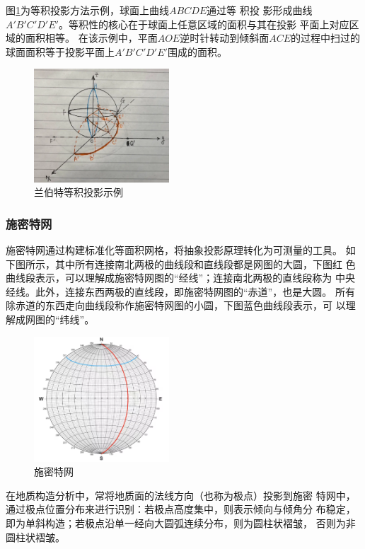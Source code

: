 \documentclass[a4paper,twoside]{ctexart}
\begin{document}
图\ref{fig:兰伯特等积投影}为等积投影方法示例，球面上曲线$ABCDE$通过等
积投
影形成曲线$A'B'C'D'E'$。等积性的核心在于球面上任意区域的面积与其在投影
平面上对应区域的面积相等。
在该示例中，平面$AOE$逆时针转动到倾斜面$ACE$的过程中扫过的
球面面积等于投影平面上$A'B'C'D'E'$围成的面积。

\begin{figure}[htbp]
  \centering
    \includegraphics[width=0.45\textwidth]{pic/兰伯特等积投影.png}
  \caption{兰伯特等积投影示例}
  \label{fig:兰伯特等积投影}
\end{figure}

\subsubsection{施密特网}

施密特网通过构建标准化等面积网格，将抽象投影原理转化为可测量的工具。
如下图所示，其中所有连接南北两极的曲线段和直线段都是网图的大圆，下图红
色曲线段表示，可以理解成施密特网图的“经线”；连接南北两极的直线段称为
中央经线。此外，连接东西两极的直线段，即施密特网图的“赤道”，也是大圆。
所有除赤道的东西走向曲线段称作施密特网图的小圆，下图蓝色曲线段表示，可
以理解成网图的“纬线”。

\begin{figure}[htbp]
  \centering
    \includegraphics[width=0.45\textwidth]{pic/施密特网.png}
  \caption{施密特网}
  \label{fig:施密特网}
\end{figure}

在地质构造分析中，常将地质面的法线方向（也称为极点）投影到施密
特网中，通过极点位置分布来进行识别：若极点高度集中，则表示倾向与倾角分
布稳定，即为单斜构造；若极点沿单一经向大圆弧连续分布，则为圆柱状褶皱，
否则为非圆柱状褶皱。
\end{document}

